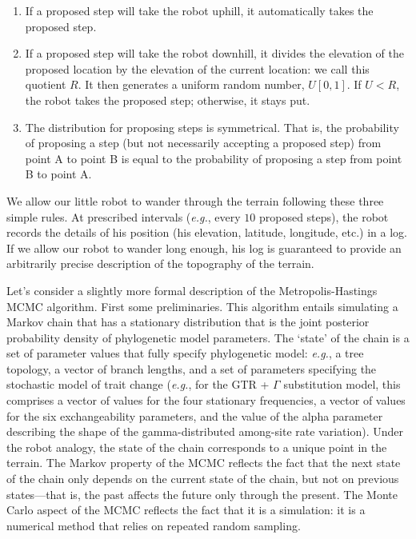\begin{enumerate}
\item{If a proposed step will take the robot uphill, it automatically takes the proposed step.}

\item{If a proposed step will take the robot downhill, it divides the elevation of the proposed location by the elevation of the current location: we call this quotient $R$. 
It then generates a uniform random number, $U[0,1]$. 
If $U<R$, the robot takes the proposed step; otherwise, it stays put.}

\item{The distribution for proposing steps is symmetrical. 
That is, the probability of proposing a step (but not necessarily accepting a proposed step) from point A to point B is equal to the probability of proposing a step from point B to point A.}
\end{enumerate}

We allow our little robot to wander through the terrain following these three simple rules. 
At prescribed intervals  ({\it e.g.}, every $10$ proposed steps), the robot records the details of his position (his elevation, latitude, longitude, etc.) in a log. 
If we allow our robot to wander long enough, his log is guaranteed to provide an arbitrarily precise description of the topography of the terrain. 

Let's consider a slightly more formal description of the Metropolis-Hastings MCMC algorithm. 
First some preliminaries. 
This algorithm entails simulating a Markov chain that has a stationary distribution that is the joint posterior probability density of phylogenetic model parameters. 
The `state' of the chain is a set of parameter values that fully specify phylogenetic model: {\it e.g.}, a tree topology, a vector of branch lengths, and a set of parameters specifying the stochastic model of trait change ({\it e.g.}, for the GTR + $\Gamma$ substitution model, this comprises a vector of values for the four stationary frequencies, a vector of values for the six exchangeability parameters, and the value of the alpha parameter describing the shape of the gamma-distributed among-site rate variation). 
Under the robot analogy, the state of the chain corresponds to a unique point in the terrain. 
The Markov property of the MCMC reflects the fact that the next state of the chain only depends on the current state of the chain, but not on previous states---that is, the past affects the future only through the present. 
The Monte Carlo aspect of the MCMC reflects the fact that it is a simulation: it is a numerical method that relies on repeated random sampling.

